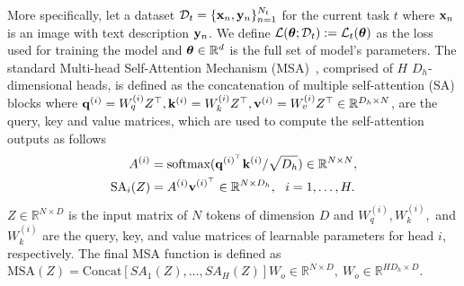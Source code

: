 More specifically, let a dataset $\mathcal{D}_t = \{\mathbf{x}_n, \mathbf{y}_n \}_{n=1}^{N_t}$ for the current task $t$ where $\mathbf{x}_n$ is an image with text description $\mathbf{y}_n$. We define $\mathcal{L}(\boldsymbol{\theta}; \mathcal{D}_t) := \mathcal{L}_t(\boldsymbol{\theta})$ as the  loss used for training the model and $\boldsymbol{\theta} \in \mathbb{R}^d$ is the full set of model's parameters. The standard Multi-head Self-Attention Mechanism (MSA)~\cite{vaswani2017attention}, comprised of $H$ $D_h$-dimensional heads, is defined as the concatenation of multiple self-attention (SA) blocks where $\mathbf{q}^{(i)} = W_q^{(i)} Z^{\top}, \mathbf{k}^{(i)} = W_k^{(i)} Z^{\top}, \mathbf{v}^{(i)} = W_v^{(i)} Z^{\top} \in \mathbb{R}^{D_h \times N}$, are the query, key and value matrices, which are used to compute the self-attention outputs as follows
\begin{align}
        A^{(i)} & = \text{softmax}( \mathbf{q}^{(i)^\top} \mathbf{k}^{(i)} / \sqrt{D_h} )  \in \mathbb{R}^{N \times N}, \\
        \text{SA}_i(Z) & = A^{(i)} \mathbf{v}^{(i)^\top}  \in \mathbb{R}^{N \times D_h}, ~~i=1, \ldots, H.
\end{align}
$Z \in \mathbb{R}^{N \times D}$ is the input matrix of $N$ tokens of dimension $D$ and $ W_q^{(i)},  W_k^{(i)},$ and $ W_k^{(i)}$ are the query, key, and value matrices of learnable parameters for head $i$, respectively. The final MSA function is defined as 
$\text{MSA}(Z) = \text{Concat}\left[ SA_1(Z), \ldots, SA_H(Z)  \right] W_o \in \mathbb{R}^{N \times D},~W_o \in \mathbb{R}^{H D_h \times D}$.

